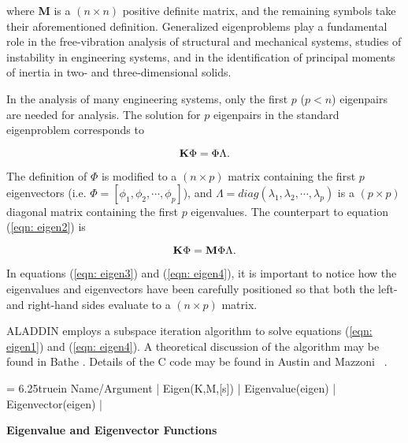 \vspace{0.15 in}\noindent
where {\bf M} is a $(n \times n)$ positive definite matrix,
and the remaining symbols take their aforementioned definition.
Generalized eigenproblems play a fundamental role in the
free-vibration analysis of structural and mechanical systems,
studies of instability in engineering systems,
and in the identification of principal moments of
inertia in two- and three-dimensional solids.

\vspace{0.15 in}
\noindent\hspace{0.5 in}
In the analysis of many engineering systems, only the first 
$p$ ($p < n$) eigenpairs are needed for analysis.
The solution for $p$ eigenpairs in the standard eigenproblem corresponds to

\begin{equation}
{\bf K} \Phi = \Phi \Lambda.
\label{eqn: eigen3}
\end{equation}

\vspace{0.15 in}\noindent
The definition of $\Phi$ is modified to a $(n \times p)$
matrix containing the first $p$
eigenvectors (i.e. $\Phi = \left[ \phi_1, \phi_2, \cdots , \phi_p \right]$),
and $\Lambda = diag(\lambda_1, \lambda_2, \cdots, \lambda_p)$ is
a $(p \times p)$ diagonal matrix containing the first $p$ eigenvalues.
The counterpart to equation (\ref{eqn: eigen2}) is

\begin{equation}
{\bf K} \Phi = {\bf M} \Phi \Lambda.
\label{eqn: eigen4}
\end{equation}

\vspace{0.15 in}\noindent
In equations (\ref{eqn: eigen3}) and (\ref{eqn: eigen4}),
it is important to notice how the eigenvalues and eigenvectors 
have been carefully positioned so that both the left- and right-hand
sides evaluate to a $(n \times p)$ matrix.

\vspace{0.15 in}
\noindent\hspace{0.50 in}
ALADDIN employs a subspace iteration algorithm to solve
equations (\ref{eqn: eigen1}) and (\ref{eqn: eigen4}).
A theoretical discussion of the algorithm may be found in Bathe \cite{bathe76}.
Details of the C code may be found in Austin and Mazzoni ~\cite{austin95}.

\begin{table}[t]
\tablewidth = 6.25truein
\begintable
Name/Argument      |                                     \crthick
Eigen(K,M,[s])     |          \cr
Eigenvalue(eigen)  |            \cr
Eigenvector(eigen) |                             
\endtable
\vspace{0.01 in}
\caption{\bf Eigenvalue and Eigenvector Functions}
\label{tab: my-eigenvalue-functions}
\end{table}

